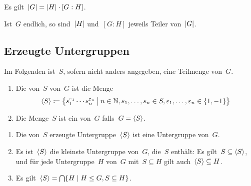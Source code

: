 \begin{corollary}
  Es gilt~$\lvert G\rvert = \lvert H\rvert \cdot [G : H]$.
\end{corollary}

\begin{corollary}
  Ist~$G$ endlich, so sind~$\lvert H\rvert$ und~$[G : H]$ jeweils Teiler von~$\lvert G\rvert$.
\end{corollary}



\subsection{Erzeugte Untergruppen}

\begin{convention}
  Im Folgenden ist~$S$, sofern nicht anders angegeben, eine Teilmenge von~$G$.
\end{convention}

\begin{definition}
  \leavevmode
  \begin{enumerate}
    \item
      Die von~$S$  von~$G$ ist die Menge
      \[
        \gen{S}
        \defined
        \bigl\{
          s_1^{\varepsilon_1} \dotsm s_n^{\varepsilon_n}
        \suchthat[\big]
          n \in \Natural,
          s_1, \dotsc, s_n \in S,
          \varepsilon_1, \dotsc, \varepsilon_n \in \{1, -1\}
        \bigr\}
      \]
    \item
      Die Menge~$S$ ist ein  von~$G$ falls~$G = \langle S\rangle$.
  \end{enumerate}
\end{definition}

\begin{proposition}
  \leavevmode
  \begin{enumerate}
    \item
      Die von~$S$ erzeugte Untergruppe~$\langle S\rangle$ ist eine Untergruppe von~$G$.
    \item
      Es ist~$\langle S\rangle$ die kleinste Untergruppe von~$G$, die~$S$ enthält:
      Es gilt~$S \subseteq \langle S\rangle$, und für jede Untergruppe~$H$ von~$G$ mit~$S \subseteq H$ gilt auch~$\langle S\rangle \subseteq H$.
    \item
      Es gilt~$\gen{S} = \bigcap \{ H \suchthat H \subgroupeq G, S \subseteq H \}$.
  \end{enumerate}
\end{proposition}


